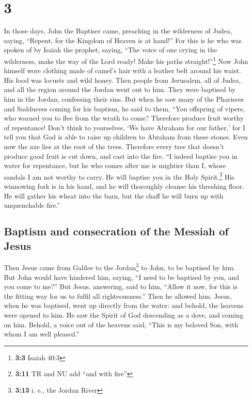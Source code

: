 \hypertarget{section-2}{%
\section{3}\label{section-2}}

 In those days, John the Baptiser came, preaching in the
wilderness of Judea, saying,  ``Repent, for the Kingdom of
Heaven is at hand!''  For this is he who was spoken of by
Isaiah the prophet, saying, ``The voice of one crying in the wilderness,
make the way of the Lord ready! Make his paths straight!''\footnote{\textbf{3:3}
  Isaiah 40:3}  Now John himself wore clothing made of
camel's hair with a leather belt around his waist. His food was locusts
and wild honey.  Then people from Jerusalem, all of Judea,
and all the region around the Jordan went out to him. 
They were baptised by him in the Jordan, confessing their sins.
 But when he saw many of the Pharisees and Sadducees
coming for his baptism, he said to them, ``You offspring of vipers, who
warned you to flee from the wrath to come?  Therefore
produce fruit worthy of repentance!  Don't think to
yourselves, `We have Abraham for our father,' for I tell you that God is
able to raise up children to Abraham from these stones. 
Even now the axe lies at the root of the trees. Therefore every tree
that doesn't produce good fruit is cut down, and cast into the fire.
 ``I indeed baptise you in water for repentance, but he
who comes after me is mightier than I, whose sandals I am not worthy to
carry. He will baptise you in the Holy Spirit.\footnote{\textbf{3:11} TR
  and NU add ``and with fire''}  His winnowing fork is in
his hand, and he will thoroughly cleanse his threshing floor. He will
gather his wheat into the barn, but the chaff he will burn up with
unquenchable fire.''

\hypertarget{baptism-and-consecration-of-the-messiah-of-jesus}{%
\subsection{Baptism and consecration of the Messiah of
Jesus}\label{baptism-and-consecration-of-the-messiah-of-jesus}}

 Then Jesus came from Galilee to the Jordan\footnote{\textbf{3:13}
  i. e., the Jordan River} to John, to be baptised by him.
 But John would have hindered him, saying, ``I need to be
baptised by you, and you come to me?''  But Jesus,
answering, said to him, ``Allow it now, for this is the fitting way for
us to fulfil all righteousness.'' Then he allowed him. 
Jesus, when he was baptised, went up directly from the water: and
behold, the heavens were opened to him. He saw the Spirit of God
descending as a dove, and coming on him.  Behold, a voice
out of the heavens said, ``This is my beloved Son, with whom I am well
pleased.''

